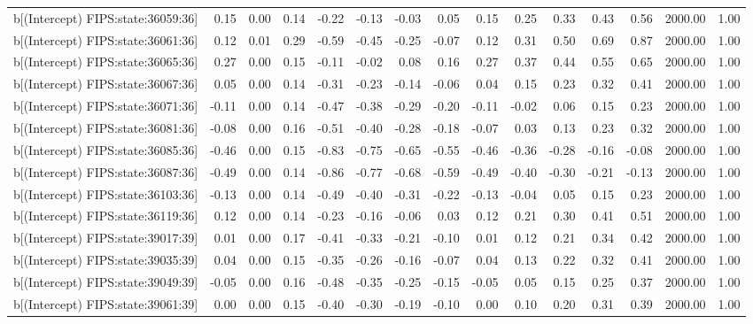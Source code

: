 \begin{table}[ht]
\begin{tabular}{rrrrrrrrrrrrrrr}
  b[(Intercept) FIPS:state:36059:36] & 0.15 & 0.00 & 0.14 & -0.22 & -0.13 & -0.03 & 0.05 & 0.15 & 0.25 & 0.33 & 0.43 & 0.56 & 2000.00 & 1.00 \\ 
  b[(Intercept) FIPS:state:36061:36] & 0.12 & 0.01 & 0.29 & -0.59 & -0.45 & -0.25 & -0.07 & 0.12 & 0.31 & 0.50 & 0.69 & 0.87 & 2000.00 & 1.00 \\ 
  b[(Intercept) FIPS:state:36065:36] & 0.27 & 0.00 & 0.15 & -0.11 & -0.02 & 0.08 & 0.16 & 0.27 & 0.37 & 0.44 & 0.55 & 0.65 & 2000.00 & 1.00 \\ 
  b[(Intercept) FIPS:state:36067:36] & 0.05 & 0.00 & 0.14 & -0.31 & -0.23 & -0.14 & -0.06 & 0.04 & 0.15 & 0.23 & 0.32 & 0.41 & 2000.00 & 1.00 \\ 
  b[(Intercept) FIPS:state:36071:36] & -0.11 & 0.00 & 0.14 & -0.47 & -0.38 & -0.29 & -0.20 & -0.11 & -0.02 & 0.06 & 0.15 & 0.23 & 2000.00 & 1.00 \\ 
  b[(Intercept) FIPS:state:36081:36] & -0.08 & 0.00 & 0.16 & -0.51 & -0.40 & -0.28 & -0.18 & -0.07 & 0.03 & 0.13 & 0.23 & 0.32 & 2000.00 & 1.00 \\ 
  b[(Intercept) FIPS:state:36085:36] & -0.46 & 0.00 & 0.15 & -0.83 & -0.75 & -0.65 & -0.55 & -0.46 & -0.36 & -0.28 & -0.16 & -0.08 & 2000.00 & 1.00 \\ 
  b[(Intercept) FIPS:state:36087:36] & -0.49 & 0.00 & 0.14 & -0.86 & -0.77 & -0.68 & -0.59 & -0.49 & -0.40 & -0.30 & -0.21 & -0.13 & 2000.00 & 1.00 \\ 
  b[(Intercept) FIPS:state:36103:36] & -0.13 & 0.00 & 0.14 & -0.49 & -0.40 & -0.31 & -0.22 & -0.13 & -0.04 & 0.05 & 0.15 & 0.23 & 2000.00 & 1.00 \\ 
  b[(Intercept) FIPS:state:36119:36] & 0.12 & 0.00 & 0.14 & -0.23 & -0.16 & -0.06 & 0.03 & 0.12 & 0.21 & 0.30 & 0.41 & 0.51 & 2000.00 & 1.00 \\ 
  b[(Intercept) FIPS:state:39017:39] & 0.01 & 0.00 & 0.17 & -0.41 & -0.33 & -0.21 & -0.10 & 0.01 & 0.12 & 0.21 & 0.34 & 0.42 & 2000.00 & 1.00 \\ 
  b[(Intercept) FIPS:state:39035:39] & 0.04 & 0.00 & 0.15 & -0.35 & -0.26 & -0.16 & -0.07 & 0.04 & 0.13 & 0.22 & 0.32 & 0.41 & 2000.00 & 1.00 \\ 
  b[(Intercept) FIPS:state:39049:39] & -0.05 & 0.00 & 0.16 & -0.48 & -0.35 & -0.25 & -0.15 & -0.05 & 0.05 & 0.15 & 0.25 & 0.37 & 2000.00 & 1.00 \\ 
  b[(Intercept) FIPS:state:39061:39] & 0.00 & 0.00 & 0.15 & -0.40 & -0.30 & -0.19 & -0.10 & 0.00 & 0.10 & 0.20 & 0.31 & 0.39 & 2000.00 & 1.00 \\ 

\end{tabular}
\end{table}
